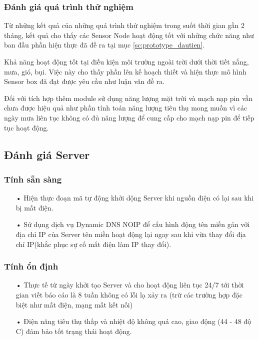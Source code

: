 \subsubsection*{Đánh giá quá trình thử nghiệm}
Từ những kết quả của những quá trình thử nghiệm trong suốt thời gian gần 2 tháng, kết quả cho thấy các Sensor Node hoạt động tốt với những chức năng như ban đầu phần hiện thực đã đề ra tại mục \ref{sc:prototype_dautien}.

Khả năng hoạt động tốt tại điều kiện môi trường ngoài trời dưới thời tiết nắng, mưa, gió, bụi. Việc này cho thấy phần lên kế hoạch thiết và hiện thực mô hình Sensor box đã đạt được yêu cầu như luận văn đề ra.

Đối với tích hợp thêm module sử dụng năng lượng mặt trời và	mạch nạp pin vẫn chưa được hiệu quả như phần tính toán năng lượng tiêu thụ mong muốn vì các ngày mưa liên tục không có đủ năng lượng để cung cấp cho mạch nạp pin để tiếp tục hoạt động.

\subsection{Đánh giá Server}
\subsubsection*{Tính sẵn sàng}
\begin{itemize}
\item[•] Hiện thực đoạn mã tự động khởi dộng Server khi nguồn điện có lại sau khi bị mất điện.\
\item[•] Sử dụng dịch vụ Dynamic DNS NOIP để cấu hình động tên miền gán với địa chỉ IP của Server tên miền hoạt động lại ngay sau khi vừa thay đổi địa chỉ IP(khắc phục sự cố mất điện làm IP thay đổi).
\end{itemize}
\subsubsection*{Tính ổn định}
\begin{itemize}
	\item[•]Thực tế từ ngày khởi tạo Server và cho hoạt động liên tục 24/7 tới thời gian viết báo cáo là 8 tuần không có lỗi lạ xảy ra (trừ các trường hợp đặc biệt như mất điện, mạng mất kết nối)
	\item[•]Điện năng tiêu thụ thấp và nhiệt độ không quá cao, giao động (44 - 48 độ C) đảm bảo tốt trạng thái hoạt động.
\end{itemize}
